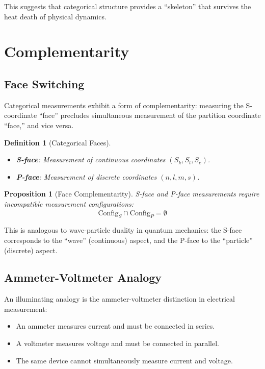 \documentclass[twocolumn,10pt]{article}
\newtheorem{proposition}[theorem]{Proposition}
\newtheorem{definition}[theorem]{Definition}
\begin{document}
This suggests that categorical structure provides a ``skeleton'' that survives the heat death of physical dynamics.

\section{Complementarity}

\subsection{Face Switching}

Categorical measurements exhibit a form of complementarity: measuring the S-coordinate ``face'' precludes simultaneous measurement of the partition coordinate ``face,'' and vice versa.

\begin{definition}[Categorical Faces]
\begin{itemize}
    \item \textbf{S-face}: Measurement of continuous coordinates $(S_k, S_t, S_e)$.
    \item \textbf{P-face}: Measurement of discrete coordinates $(n, l, m, s)$.
\end{itemize}
\end{definition}

\begin{proposition}[Face Complementarity]
S-face and P-face measurements require incompatible measurement configurations:
\begin{equation}
    \text{Config}_S \cap \text{Config}_P = \emptyset
\end{equation}
\end{proposition}

This is analogous to wave-particle duality in quantum mechanics: the S-face corresponds to the ``wave'' (continuous) aspect, and the P-face to the ``particle'' (discrete) aspect.

\subsection{Ammeter-Voltmeter Analogy}

An illuminating analogy is the ammeter-voltmeter distinction in electrical measurement:
\begin{itemize}
    \item An ammeter measures current and must be connected in series.
    \item A voltmeter measures voltage and must be connected in parallel.
    \item The same device cannot simultaneously measure current and voltage.
\end{itemize}
\end{document}
